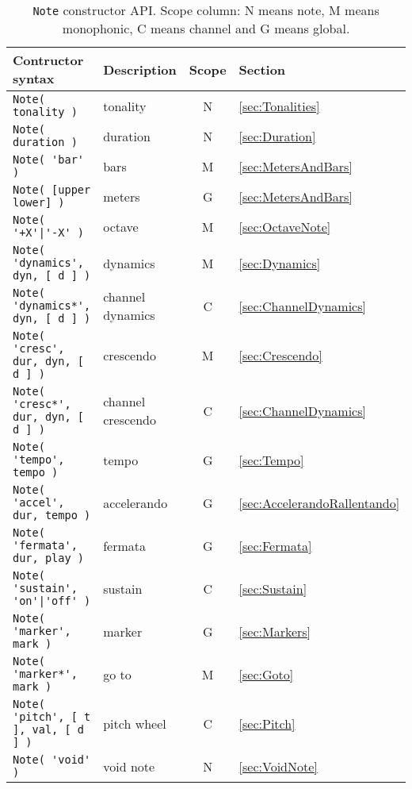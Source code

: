 \documentclass{article}
\begin{document}
\begin{table}
	\centering
	\begin{tabular}{llcl}
		Contructor syntax & Description & Scope & Section \\
		\hline
		\lstinline!Note( tonality )! & tonality & N & \ref{sec:Tonalities} \\
		\lstinline!Note( duration )! & duration & N & \ref{sec:Duration} \\
		\lstinline!Note( 'bar' )! & bars & M & \ref{sec:MetersAndBars} \\
		\lstinline!Note( [upper lower] )! & meters & G & \ref{sec:MetersAndBars} \\
		\lstinline!Note( '+X'|'-X' )! & octave & M & \ref{sec:OctaveNote} \\
		\lstinline!Note( 'dynamics', dyn, [ d ] )! & dynamics & M & \ref{sec:Dynamics} \\
		\lstinline!Note( 'dynamics*', dyn, [ d ] )! & channel dynamics & C & \ref{sec:ChannelDynamics} \\
		\lstinline!Note( 'cresc', dur, dyn, [ d ] )! & crescendo & M & \ref{sec:Crescendo} \\
		\lstinline!Note( 'cresc*', dur, dyn, [ d ] )! & channel crescendo & C & \ref{sec:ChannelDynamics} \\
		\lstinline!Note( 'tempo', tempo )! & tempo & G & \ref{sec:Tempo} \\
		\lstinline!Note( 'accel', dur, tempo )! & accelerando & G & \ref{sec:AccelerandoRallentando} \\
		\lstinline!Note( 'fermata', dur, play )! & fermata & G & \ref{sec:Fermata} \\
		\lstinline!Note( 'sustain', 'on'|'off' )! & sustain & C & \ref{sec:Sustain} \\
		\lstinline!Note( 'marker', mark )! & marker & G & \ref{sec:Markers} \\
		\lstinline!Note( 'marker*', mark )! & go to & M & \ref{sec:Goto} \\
		\lstinline!Note( 'pitch', [ t ], val, [ d ] )! & pitch wheel & C & \ref{sec:Pitch} \\
		\lstinline!Note( 'void' )! & void note & N & \ref{sec:VoidNote} \\
	\end{tabular}
	\caption[\lstinline!Note! constructor API]{\lstinline!Note! constructor API. Scope column: N means note, M means monophonic, C means channel and G means global.}
	\label{tab:NoteAPI}
\end{table}
\end{document}
